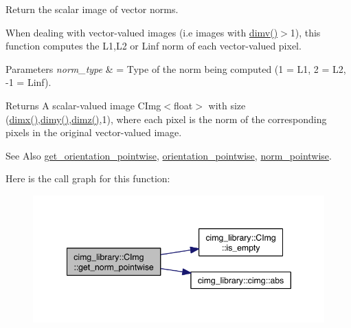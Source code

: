 Return the scalar image of vector norms. 

When dealing with vector-\/valued images (i.\-e images with \hyperlink{structcimg__library_1_1_c_img_ad30f8300f32a94a80e1e06c84a45de49}{dimv()}$>$1), this function computes the L1,L2 or Linf norm of each vector-\/valued pixel. 
\begin{DoxyParams}{Parameters}
{\em norm\-\_\-type} & = Type of the norm being computed (1 = L1, 2 = L2, -\/1 = Linf). \\
\hline
\end{DoxyParams}
\begin{DoxyReturn}{Returns}
A scalar-\/valued image C\-Img$<$float$>$ with size (\hyperlink{structcimg__library_1_1_c_img_abf1a3c383880a20428b2ea9d22f3c06e}{dimx()},\hyperlink{structcimg__library_1_1_c_img_aa1e128f9d950b39ed312eb368741970c}{dimy()},\hyperlink{structcimg__library_1_1_c_img_aba56e96a615d71ed9a71009768fc4b75}{dimz()},1), where each pixel is the norm of the corresponding pixels in the original vector-\/valued image. 
\end{DoxyReturn}
\begin{DoxySeeAlso}{See Also}
\hyperlink{structcimg__library_1_1_c_img_a4d834ce02a75be3c91b69d1a932f1707}{get\-\_\-orientation\-\_\-pointwise}, \hyperlink{structcimg__library_1_1_c_img_a361a2f26fd4692a9f429982d2a071985}{orientation\-\_\-pointwise}, \hyperlink{structcimg__library_1_1_c_img_a2c7af7a94c6ada6645257c8cd0ffa791}{norm\-\_\-pointwise}. 
\end{DoxySeeAlso}


Here is the call graph for this function\-:
\nopagebreak
\begin{figure}[H]
\begin{center}
\leavevmode
\includegraphics[width=346pt]{structcimg__library_1_1_c_img_a468e303545c56e068bf2f8e90b203be2_cgraph}
\end{center}
\end{figure}




